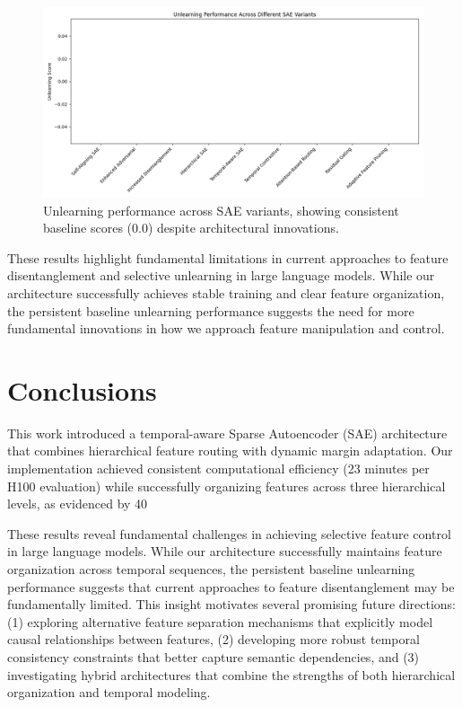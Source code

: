 \documentclass{article} %
\begin{document}
\begin{figure}[h]
    \centering
    \includegraphics[width=\textwidth]{unlearning_scores.png}
    \caption{Unlearning performance across SAE variants, showing consistent baseline scores (0.0) despite architectural innovations.}
    \label{fig:unlearning_scores}
\end{figure}

These results highlight fundamental limitations in current approaches to feature disentanglement and selective unlearning in large language models. While our architecture successfully achieves stable training and clear feature organization, the persistent baseline unlearning performance suggests the need for more fundamental innovations in how we approach feature manipulation and control.

\section{Conclusions}
\label{sec:conclusion}

This work introduced a temporal-aware Sparse Autoencoder (SAE) architecture that combines hierarchical feature routing with dynamic margin adaptation. Our implementation achieved consistent computational efficiency (23 minutes per H100 evaluation) while successfully organizing features across three hierarchical levels, as evidenced by 40%

These results reveal fundamental challenges in achieving selective feature control in large language models. While our architecture successfully maintains feature organization across temporal sequences, the persistent baseline unlearning performance suggests that current approaches to feature disentanglement may be fundamentally limited. This insight motivates several promising future directions: (1) exploring alternative feature separation mechanisms that explicitly model causal relationships between features, (2) developing more robust temporal consistency constraints that better capture semantic dependencies, and (3) investigating hybrid architectures that combine the strengths of both hierarchical organization and temporal modeling.
\end{document}
